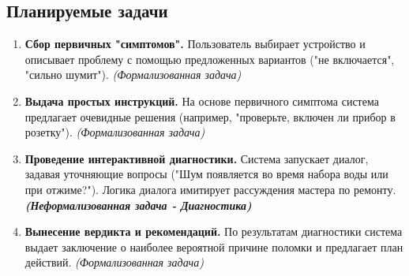 \documentclass[12pt, a4paper]{article}
\begin{document}
\subsection*{Планируемые задачи}
\begin{enumerate}
    \item \textbf{Сбор первичных "симптомов".} Пользователь выбирает устройство и описывает проблему с помощью предложенных вариантов ("не включается", "сильно шумит").
    \textit{(Формализованная задача)}

    \item \textbf{Выдача простых инструкций.} На основе первичного симптома система предлагает очевидные решения (например, "проверьте, включен ли прибор в розетку").
    \textit{(Формализованная задача)}

    \item \textbf{Проведение интерактивной диагностики.} Система запускает диалог, задавая уточняющие вопросы ("Шум появляется во время набора воды или при отжиме?"). Логика диалога имитирует рассуждения мастера по ремонту.
    \textit{\textbf{(Неформализованная задача - Диагностика)}}
    
    \item \textbf{Вынесение вердикта и рекомендаций.} По результатам диагностики система выдает заключение о наиболее вероятной причине поломки и предлагает план действий.
    \textit{(Формализованная задача)}
\end{enumerate}
\end{document}
